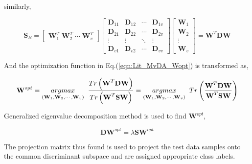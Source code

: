 similarly,

\begin{equation}
\label{eqn:Lit_MvDA_SBytoDjr}
\textbf{S}_B = \begin{bmatrix}
\textbf{W}_1^T \; \textbf{W}_2^T \; \cdots \; \textbf{W}_v^T
\end{bmatrix} 
\begin{bmatrix}
\textbf{D}_{11} & \textbf{D}_{12} & \cdots & \textbf{D}_{1v}\\ 
\textbf{D}_{21} & \textbf{D}_{22} & \cdots & \textbf{D}_{2v}\\ 
\vdots & \vdots & \ddots & \vdots\\ 
\textbf{D}_{v1} & \textbf{D}_{v2} & \cdots & \textbf{D}_{vv} 
\end{bmatrix}
\begin{bmatrix}
\textbf{W}_1\\ 
\textbf{W}_2\\ 
\vdots\\ 
\textbf{W}_v
\end{bmatrix} 
= \textbf{W}^T \textbf{D} \textbf{W}
\end{equation}

\noindent
And the optimization function in Eq.(\ref{eqn:Lit_MvDA_Wopt}) is transformed as,

\begin{equation}
\label{eqn:Lit_MvDA_WoptRT}
\textbf{W}^{opt} = \underset{\left ( \textbf{W}_1, \textbf{W}_2,\cdots,\textbf{W}_v \right )}{argmax} \hspace{0.2cm} \frac{Tr\left ( \textbf{W}^T \textbf{D} \textbf{W} \right )}{Tr\left ( \textbf{W}^T \textbf{S} \textbf{W} \right )} = \underset{\left ( \textbf{W}_1, \textbf{W}_2,\cdots,\textbf{W}_v \right )}{argmax} \hspace{0.2cm} Tr\left ( \frac{\textbf{W}^T \textbf{D} \textbf{W}}{\textbf{W}^T \textbf{S} \textbf{W}} \right )
\end{equation}

Generalized eigenvalue decomposition method is used to find $\textbf{W}^{opt}$,

\begin{equation}
\label{eqn:Lit_MvDA_GEP}
\textbf{D} \textbf{W}^{opt} = \lambda \textbf{S} \textbf{W}^{opt}
\end{equation}

The projection matrix thus found is used to project the test data samples onto the common discriminant subspace and are assigned appropriate class labels.







